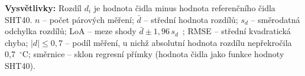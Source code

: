 \begin{table}[ht]
\centering
\small
\setlength{\tabcolsep}{4pt}
\caption{Porovnání čidel (teplota), rozdíl čidla a referenčního SHT40 (jen klidné minuty)}
\label{tab:porovnani-teplota_klid}
\vspace{2mm}

\begin{minipage}{0.95\textwidth}
\footnotesize
\raggedright
\textbf{Vysvětlivky:} Rozdíl $d_i$ je hodnota čidla minus hodnota referenčního
čidla SHT40. $n$ -- počet párových měření; $\bar{d}$ -- střední hodnota
rozdílů; $s_d$ -- směrodatná odchylka rozdílů; LoA -- meze shody
$\bar{d} \pm 1{,}96\,s_d$~\cite{bland-altman-1986}; RMSE -- střední
kvadratická chyba; $|d|\le 0{,}7$ -- podíl měření, u nichž absolutní hodnota
rozdílu nepřekročila 0,7~$^\circ$C; směrnice -- sklon regresní přímky
(hodnota čidla jako funkce hodnoty SHT40).
\end{minipage}
\end{table}

